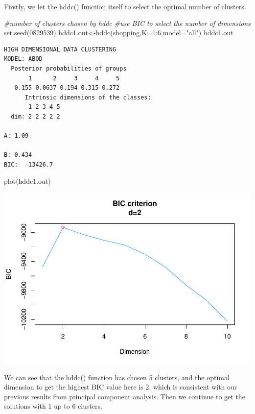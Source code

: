 \documentclass[
  11pt,
]{article}
\newenvironment{Shaded}{\begin{snugshade}}{\end{snugshade}}
\newcommand{\AttributeTok}[1]{\textcolor[rgb]{0.77,0.63,0.00}{#1}}
\newcommand{\CommentTok}[1]{\textcolor[rgb]{0.56,0.35,0.01}{\textit{#1}}}
\newcommand{\DecValTok}[1]{\textcolor[rgb]{0.00,0.00,0.81}{#1}}
\newcommand{\FunctionTok}[1]{\textcolor[rgb]{0.00,0.00,0.00}{#1}}
\newcommand{\NormalTok}[1]{#1}
\newcommand{\OtherTok}[1]{\textcolor[rgb]{0.56,0.35,0.01}{#1}}
\newcommand{\SpecialCharTok}[1]{\textcolor[rgb]{0.00,0.00,0.00}{#1}}
\newcommand{\StringTok}[1]{\textcolor[rgb]{0.31,0.60,0.02}{#1}}
\begin{document}
Firstly, we let the hddc() function itself to select the optimal number of clusters.

\begin{Shaded}
\begin{Highlighting}[]
\CommentTok{\#number of clusters chosen by hddc}
\CommentTok{\#use BIC to select the number of dimensions}
\FunctionTok{set.seed}\NormalTok{(}\DecValTok{0829539}\NormalTok{)}
\NormalTok{hddc1.out}\OtherTok{\textless{}{-}}\FunctionTok{hddc}\NormalTok{(shopping,}\AttributeTok{K=}\DecValTok{1}\SpecialCharTok{:}\DecValTok{6}\NormalTok{,}\AttributeTok{model=}\StringTok{"all"}\NormalTok{)}
\NormalTok{hddc1.out}
\end{Highlighting}
\end{Shaded}

\begin{verbatim}
HIGH DIMENSIONAL DATA CLUSTERING
MODEL: ABQD
  Posterior probabilities of groups
       1      2     3     4     5
   0.155 0.0637 0.194 0.315 0.272
      Intrinsic dimensions of the classes:
       1 2 3 4 5
  dim: 2 2 2 2 2
       
A: 1.09
        
B: 0.434
BIC:  -13426.7 
\end{verbatim}

\begin{Shaded}
\begin{Highlighting}[]
\FunctionTok{plot}\NormalTok{(hddc1.out)}
\end{Highlighting}
\end{Shaded}

\includegraphics{report_files/figure-latex/Task_3_94-1.pdf}

We can see that the hddc() function has chosen 5 clusters, and the optimal dimension to get the highest BIC value here is 2, which is consistent with our previous results from principal component analysis.
Then we continue to get the solutions with 1 up to 6 clusters.
\end{document}
